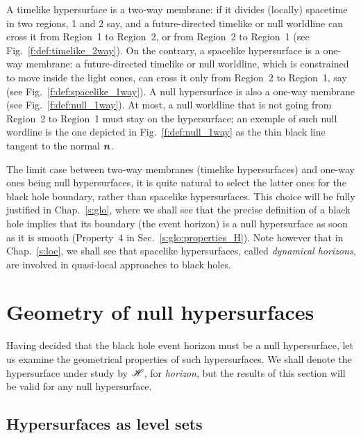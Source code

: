 A timelike hypersurface is a two-way membrane: if it divides (locally)
spacetime in two regions, 1 and 2 say, and a future-directed timelike or null
worldline can cross it from Region~1 to Region~2, or from Region~2 to Region~1
(see Fig.~\ref{f:def:timelike_2way}). On the contrary,
a spacelike hypersurface is a one-way membrane: a future-directed timelike or null
worldline, which is constrained to move inside the light cones,
can cross it only from Region~2 to Region~1, say (see Fig.~\ref{f:def:spacelike_1way}).
A null hypersurface is also a one-way membrane (see Fig.~\ref{f:def:null_1way}).
At most, a null worldline that is not going from Region~2 to Region~1 must
stay on the hypersurface; an exemple of such null wordline is
the one depicted in Fig.~\ref{f:def:null_1way} as the thin black line tangent to the normal $\bm{n}$.

The limit case between two-way membranes (timelike hypersurfaces)
and one-way ones being null hypersurfaces, it is quite natural to select the
latter ones for the black hole boundary, rather than spacelike hypersurfaces.
This choice will be fully justified in Chap.~\ref{s:glo}, where we shall see
that the precise definition of a black hole implies that its boundary
(the event horizon)
is a null hypersurface as soon as it is smooth (Property~4 in Sec.~\ref{s:glo:properties_H}).
Note however that in Chap.~\ref{s:loc}, we shall see that spacelike hypersurfaces,
called \emph{dynamical
horizons}, are involved
in quasi-local approaches to black holes.


\section{Geometry of null hypersurfaces}

Having decided that the black hole event horizon must be a null hypersurface,
let us examine the geometrical properties of such hypersurfaces. We shall
denote the hypersurface under study by $\mathscr{H}$, for \emph{horizon}, but the results of this section
will be valid for any null hypersurface.

\subsection{Hypersurfaces as level sets}

